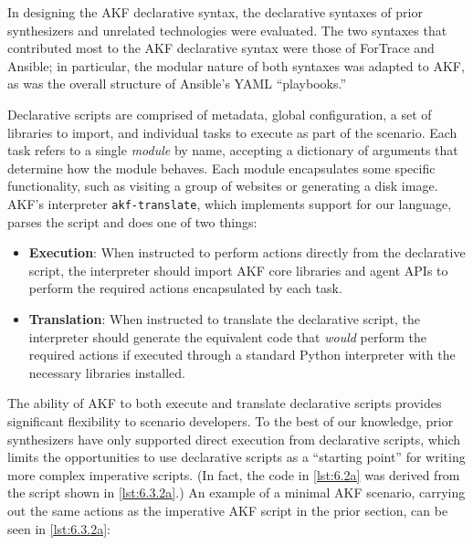 \documentclass[final,5p,times,twocolumn]{elsarticle}
\newcommand{\passthrough}[1]{#1}
\begin{document}
In designing the AKF declarative syntax, the declarative syntaxes of
prior synthesizers and unrelated technologies were evaluated. The two
syntaxes that contributed most to the AKF declarative syntax were those
of ForTrace and Ansible; in particular, the modular nature of both
syntaxes was adapted to AKF, as was the overall structure of Ansible's
YAML ``playbooks.''

Declarative scripts are comprised of metadata, global configuration, a
set of libraries to import, and individual tasks to execute as part of
the scenario. Each task refers to a single \emph{module} by name,
accepting a dictionary of arguments that determine how the module
behaves. Each module encapsulates some specific functionality, such as
visiting a group of websites or generating a disk image. AKF's
interpreter \passthrough{\lstinline!akf-translate!}, which implements
support for our language, parses the script and does one of two things:

\begin{itemize}
\item
  \textbf{Execution}: When instructed to perform actions directly from
  the declarative script, the interpreter should import AKF core
  libraries and agent APIs to perform the required actions encapsulated
  by each task.
\item
  \textbf{Translation}: When instructed to translate the declarative
  script, the interpreter should generate the equivalent code that
  \emph{would} perform the required actions if executed through a
  standard Python interpreter with the necessary libraries installed.
\end{itemize}

The ability of AKF to both execute and translate declarative scripts
provides significant flexibility to scenario developers. To the best of
our knowledge, prior synthesizers have only supported direct execution
from declarative scripts, which limits the opportunities to use
declarative scripts as a ``starting point'' for writing more complex
imperative scripts. (In fact, the code in \autoref{lst:6.2a} was derived
from the script shown in \autoref{lst:6.3.2a}.) An example of a minimal
AKF scenario, carrying out the same actions as the imperative AKF script
in the prior section, can be seen in \autoref{lst:6.3.2a}:
\end{document}
